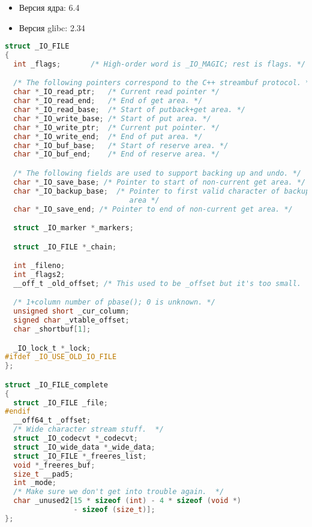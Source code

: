 
\begin{itemize}
    \item Версия ядра: 6.4
    \item Версия glibc: 2.34
\end{itemize}

\begin{lstlisting}[language=c, caption={struct \_IO\_FILE}]
struct _IO_FILE
{
  int _flags;		/* High-order word is _IO_MAGIC; rest is flags. */

  /* The following pointers correspond to the C++ streambuf protocol. */
  char *_IO_read_ptr;	/* Current read pointer */
  char *_IO_read_end;	/* End of get area. */
  char *_IO_read_base;	/* Start of putback+get area. */
  char *_IO_write_base;	/* Start of put area. */
  char *_IO_write_ptr;	/* Current put pointer. */
  char *_IO_write_end;	/* End of put area. */
  char *_IO_buf_base;	/* Start of reserve area. */
  char *_IO_buf_end;	/* End of reserve area. */

  /* The following fields are used to support backing up and undo. */
  char *_IO_save_base; /* Pointer to start of non-current get area. */
  char *_IO_backup_base;  /* Pointer to first valid character of backup
                             area */
  char *_IO_save_end; /* Pointer to end of non-current get area. */

  struct _IO_marker *_markers;

  struct _IO_FILE *_chain;

  int _fileno;
  int _flags2;
  __off_t _old_offset; /* This used to be _offset but it's too small.  */

  /* 1+column number of pbase(); 0 is unknown. */
  unsigned short _cur_column;
  signed char _vtable_offset;
  char _shortbuf[1];

  _IO_lock_t *_lock;
#ifdef _IO_USE_OLD_IO_FILE
};

struct _IO_FILE_complete
{
  struct _IO_FILE _file;
#endif
  __off64_t _offset;
  /* Wide character stream stuff.  */
  struct _IO_codecvt *_codecvt;
  struct _IO_wide_data *_wide_data;
  struct _IO_FILE *_freeres_list;
  void *_freeres_buf;
  size_t __pad5;
  int _mode;
  /* Make sure we don't get into trouble again.  */
  char _unused2[15 * sizeof (int) - 4 * sizeof (void *)
                - sizeof (size_t)];
};
\end{lstlisting}

